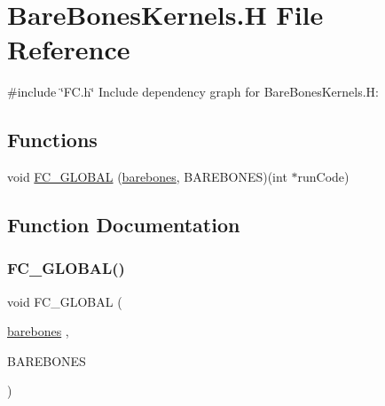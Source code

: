 \hypertarget{BareBonesKernels_8H}{}\section{Bare\+Bones\+Kernels.\+H File Reference}
\label{BareBonesKernels_8H}
{\ttfamily \#include \char`\"{}F\+C.\+h\char`\"{}}\newline
Include dependency graph for Bare\+Bones\+Kernels.\+H\+:
\subsection*{Functions}
\begin{DoxyCompactItemize}
\item 
void \hyperlink{BareBonesKernels_8H_a16f8a44fa89a106d1f631506e4a7abf0}{F\+C\+\_\+\+G\+L\+O\+B\+AL} (\hyperlink{barebones_8f90_a32de3ce5a1675cc875c4cce961663fa6}{barebones}, B\+A\+R\+E\+B\+O\+N\+ES)(int $\ast$run\+Code)
\end{DoxyCompactItemize}


\subsection{Function Documentation}
\hypertarget{BareBonesKernels_8H_a16f8a44fa89a106d1f631506e4a7abf0}{}\label{BareBonesKernels_8H_a16f8a44fa89a106d1f631506e4a7abf0} 
\subsubsection{\texorpdfstring{F\+C\+\_\+\+G\+L\+O\+B\+A\+L()}{FC\_GLOBAL()}}
{\footnotesize\ttfamily void F\+C\+\_\+\+G\+L\+O\+B\+AL (\begin{DoxyParamCaption}\item[{\hyperlink{barebones_8f90_a32de3ce5a1675cc875c4cce961663fa6}{barebones}}]{,  }\item[{B\+A\+R\+E\+B\+O\+N\+ES}]{ }\end{DoxyParamCaption})}

